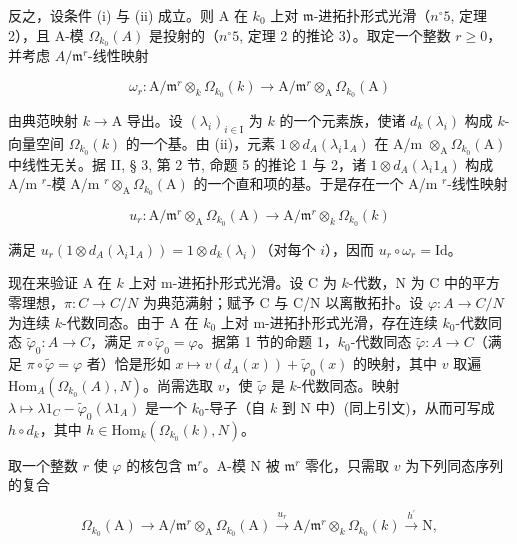 反之，设条件 (i) 与 (ii) 成立。则 A 在 \(k_{0}\) 上对 \(\mathfrak{m}\)-进拓扑形式光滑（\(n^{\circ}5\), 定理 2），且 A-模 \(\Omega_{k_{0}}(A)\) 是投射的（\(n^{\circ}5\), 定理 2 的推论 3）。取定一个整数 \(r \geqslant 0\)，并考虑 \(A/\mathfrak{m}^{r}\)-线性映射

\[
\omega_ {r}: \mathrm{A} / \mathfrak {m} ^ {r} \otimes_ {k} \Omega_ {k _ {0}} (k) \longrightarrow \mathrm{A} / \mathfrak {m} ^ {r} \otimes_ {\mathrm{A}} \Omega_ {k _ {0}} (\mathrm{A})
\]

由典范映射 \(k\to\mathrm{A}\) 导出。设 \((\lambda_{i})_{i\in\mathrm{I}}\) 为 \(k\) 的一个元素族，使诸 \(d_{k}(\lambda_{i})\) 构成 \(k\)-向量空间 \(\Omega_{k_{0}}(k)\) 的一个基。由 (ii)，元素 \(1 \otimes d_{A}(\lambda_{i}1_{A})\) 在 A/m \(\otimes_{\mathrm{A}} \Omega_{k_0}(\mathrm{A})\) 中线性无关。据 II, § 3, 第 2 节, 命题 5 的推论 1 与 2，诸 \(1 \otimes d_{A}(\lambda_{i}1_{A})\) 构成 A/m \(^{r}\)-模 A/m \(^{r} \otimes_{\mathrm{A}} \Omega_{k_0}(\mathrm{A})\) 的一个直和项的基。于是存在一个 A/m \(^{r}\)-线性映射

\[
u _ {r}: \mathrm{A} / \mathfrak {m} ^ {r} \otimes_ {\mathrm{A}} \Omega_ {k _ {0}} (\mathrm{A}) \longrightarrow \mathrm{A} / \mathfrak {m} ^ {r} \otimes_ {k} \Omega_ {k _ {0}} (k)
\]

满足 \(u_r(1 \otimes d_A(\lambda_i 1_A)) = 1 \otimes d_k(\lambda_i)\)（对每个 \(i\)），因而 \(u_r \circ \omega_r = \mathrm{Id}\)。

现在来验证 A 在 \(k\) 上对 m-进拓扑形式光滑。设 C 为 \(k\)-代数，N 为 C 中的平方零理想，\(\pi: C \to C/N\) 为典范满射；赋予 C 与 C/N 以离散拓扑。设 \(\varphi: A \to C/N\) 为连续 \(k\)-代数同态。由于 A 在 \(k_0\) 上对 m-进拓扑形式光滑，存在连续 \(k_0\)-代数同态 \(\tilde{\varphi}_0: A \to C\)，满足 \(\pi \circ \tilde{\varphi}_0 = \varphi\)。据第 1 节的命题 1，\(k_0\)-代数同态 \(\tilde{\varphi}: A \to C\)（满足 \(\pi \circ \tilde{\varphi} = \varphi\) 者）恰是形如 \(x \mapsto v(d_A(x)) + \tilde{\varphi}_0(x)\) 的映射，其中 \(v\) 取遍 \(\mathrm{Hom}_{A}(\Omega_{k_0}(A), N)\)。尚需选取 \(v\)，使 \(\tilde{\varphi}\) 是 \(k\)-代数同态。映射 \(\lambda \mapsto \lambda 1_C - \tilde{\varphi}_0(\lambda 1_A)\) 是一个 \(k_0\)-导子（自 \(k\) 到 N 中）(同上引文)，从而可写成 \(h \circ d_k\)，其中 \(h \in \mathrm{Hom}_k(\Omega_{k_0}(k), N)\)。

取一个整数 \(r\) 使 \(\varphi\) 的核包含 \(\mathfrak{m}^r\)。A-模 N 被 \(\mathfrak{m}^r\) 零化，只需取 \(v\) 为下列同态序列的复合

\[
\Omega_ {k _ {0}} (\mathrm{A}) \longrightarrow \mathrm{A} / \mathfrak {m} ^ {r} \otimes_ {\mathrm{A}} \Omega_ {k _ {0}} (\mathrm{A}) \xrightarrow {u _ {r}} \mathrm{A} / \mathfrak {m} ^ {r} \otimes_ {k} \Omega_ {k _ {0}} (k) \xrightarrow {h ^ {\prime}} \mathrm{N},
\]

